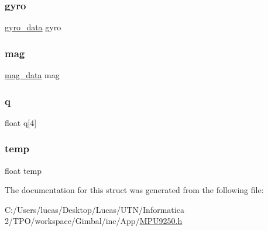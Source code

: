 \subsubsection{\texorpdfstring{gyro}{gyro}}
{\footnotesize\ttfamily \mbox{\hyperlink{_m_p_u9250_8h_a679cb4e3d714372e6c56230980ebc835}{gyro\+\_\+data}} gyro}

\mbox{\label{struct_m_p_u9250__data__t_adffaef9acb11b2eb377e9e7567b0fbb2}} 
\subsubsection{\texorpdfstring{mag}{mag}}
{\footnotesize\ttfamily \mbox{\hyperlink{_m_p_u9250_8h_a6a87651f18d8b5cd90c9b5a8c47b78c2}{mag\+\_\+data}} mag}

\mbox{\label{struct_m_p_u9250__data__t_acbffa34110f15b21994d3d087a0f4e7f}} 
\subsubsection{\texorpdfstring{q}{q}}
{\footnotesize\ttfamily float q\mbox{[}4\mbox{]}}

\mbox{\label{struct_m_p_u9250__data__t_a24d61a35b72d7299eb6b5f48e71a571b}} 
\subsubsection{\texorpdfstring{temp}{temp}}
{\footnotesize\ttfamily float temp}



The documentation for this struct was generated from the following file\+:\begin{DoxyCompactItemize}
\item 
C\+:/\+Users/lucas/\+Desktop/\+Lucas/\+U\+T\+N/\+Informatica 2/\+T\+P\+O/workspace/\+Gimbal/inc/\+App/\mbox{\hyperlink{_m_p_u9250_8h}{M\+P\+U9250.\+h}}\end{DoxyCompactItemize}
